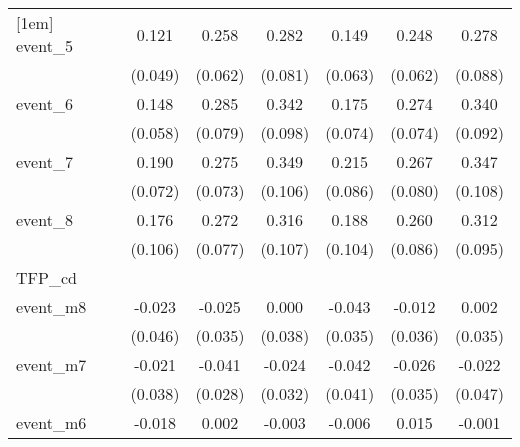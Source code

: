 {\begin{tabular}{l*{6}{c}}
[1em]
event\_5     &       0.121\sym{*}  &       0.258\sym{***}&       0.282\sym{***}&       0.149\sym{*}  &       0.248\sym{***}&       0.278\sym{**} \\
            &     (0.049)         &     (0.062)         &     (0.081)         &     (0.063)         &     (0.062)         &     (0.088)         \\
[1em]
event\_6     &       0.148\sym{*}  &       0.285\sym{***}&       0.342\sym{***}&       0.175\sym{*}  &       0.274\sym{***}&       0.340\sym{***}\\
            &     (0.058)         &     (0.079)         &     (0.098)         &     (0.074)         &     (0.074)         &     (0.092)         \\
[1em]
event\_7     &       0.190\sym{**} &       0.275\sym{***}&       0.349\sym{***}&       0.215\sym{*}  &       0.267\sym{***}&       0.347\sym{**} \\
            &     (0.072)         &     (0.073)         &     (0.106)         &     (0.086)         &     (0.080)         &     (0.108)         \\
[1em]
event\_8     &       0.176         &       0.272\sym{***}&       0.316\sym{**} &       0.188         &       0.260\sym{**} &       0.312\sym{**} \\
            &     (0.106)         &     (0.077)         &     (0.107)         &     (0.104)         &     (0.086)         &     (0.095)         \\
\hline
TFP\_cd      &                     &                     &                     &                     &                     &                     \\
event\_m8    &      -0.023         &      -0.025         &       0.000         &      -0.043         &      -0.012         &       0.002         \\
            &     (0.046)         &     (0.035)         &     (0.038)         &     (0.035)         &     (0.036)         &     (0.035)         \\
[1em]
event\_m7    &      -0.021         &      -0.041         &      -0.024         &      -0.042         &      -0.026         &      -0.022         \\
            &     (0.038)         &     (0.028)         &     (0.032)         &     (0.041)         &     (0.035)         &     (0.047)         \\
[1em]
event\_m6    &      -0.018         &       0.002         &      -0.003         &      -0.006         &       0.015         &      -0.001         \\

\end{tabular}}
